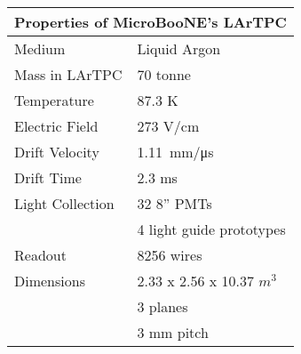 %
%
\color{blue}\begin{tabular}{| l | l |}
	\hline
	\multicolumn{2}{|c|}{\normalsize\color{black}\textbf{Properties of MicroBooNE's LArTPC}} \\ \hline \hline
\color{black}Medium & \color{black} Liquid Argon \\ \hline
\color{black}Mass in LArTPC & \color{black} 70 tonne \\ \hline
\color{black}Temperature & \color{black} 87.3 K 		\\ \hline
\color{black}Electric Field & \color{black} 273 V/cm 	\\ \hline
\color{black}Drift Velocity & \color{black} \SI{1.11}{\milli\meter/\micro\second}  \\ \hline
\color{black}Drift Time  & \color{black}2.3 ms \\ \hline %
\color{black}Light Collection & \color{black}32 8'' PMTs \\
  & \color{black} 4 light guide prototypes \\ \hline
\color{black}Readout & \color{black}8256 wires \\ \hline
\color{black}Dimensions & \color{black}2.33 x 2.56 x 10.37 $m^3$ \\
 & \color{black} 3 planes \\
  & \color{black} 3 mm pitch \\ 
 \hline

\end{tabular}

%
